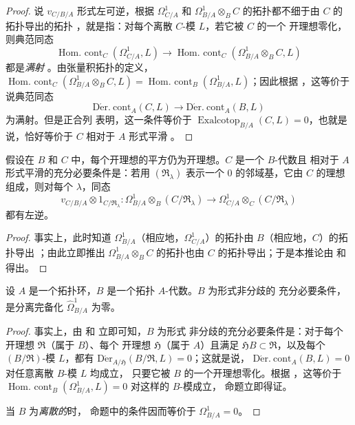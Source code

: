\begin{proof}
说 $v_{C/B/A}$ 形式左可逆，根据 $\Omega^1_{C/A}$ 和
$\Omega^1_{B/A}\otimes_B C$ 的拓扑都不细于由 $C$ 的拓扑导出的拓扑
，就是指：对每个离散 $C$-模 $L$，若它被 $C$ 的一个
开理想零化，则典范同态
\[
  \operatorname{Hom.\ cont}_C(\Omega^1_{C/A},L)\to
  \operatorname{Hom.\ cont}_C(\Omega^1_{B/A}\otimes_B C,L)
\]
都是\emph{满射} 。由张量积拓扑的定义，
$\operatorname{Hom.\ cont}_C(\Omega^1_{B/A}\otimes_B C,L)=
\operatorname{Hom.\ cont}_B(\Omega^1_{B/A},L)$；因此根据
，这等价于说典范同态
\[
  \operatorname{D\acute{e}r.\ cont}_A(C,L)\to
  \operatorname{D\acute{e}r.\ cont}_A(B,L)
\]
为满射。但是正合列  表明，这一条件等价于
$\operatorname{Exalcotop}_{B/A}(C,L)=0$，也就是说，恰好等价于 $C$ 相对于
$A$ 形式平滑 。
\end{proof}

\begin{corollary}[20.7.3]
\label{0.20.7.3-fr}
假设在 $B$ 和 $C$ 中，每个开理想的平方仍为开理想。$C$ 是一个 $B$-代数且
相对于 $A$ 形式平滑的充分必要条件是：若用 $(\mathfrak{R}_\lambda)$ 表示一个
$0$ 的邻域基，它由 $C$ 的理想组成，则对每个 $\lambda$，同态
\begin{equation}
\tag{20.7.3.1}
\label{0.20.7.3.1-fr}
  v_{C/B/A}\otimes 1_{C/\mathfrak{R}_\lambda}:
  \Omega^1_{B/A}\otimes_B(C/\mathfrak{R}_\lambda)\to
  \Omega^1_{C/A}\otimes_C(C/\mathfrak{R}_\lambda)
\end{equation}
都有左逆。
\end{corollary}

\begin{proof}
事实上，此时知道 $\Omega^1_{B/A}$（相应地，$\Omega^1_{C/A}$）的拓扑由
$B$（相应地，$C$）的拓扑导出 ；由此立即推出
$\Omega^1_{B/A}\otimes_B C$ 的拓扑也由 $C$ 的拓扑导出；于是本推论由
 和  得出。
\end{proof}

\begin{proposition}[20.7.4]
\label{0.20.7.4-fr}
设 $A$ 是一个拓扑环，$B$ 是一个拓扑 $A$-代数。$B$ 为形式非分歧的
 充分必要条件，是分离完备化
$\widehat{\Omega}^1_{B/A}$ 为零。
\end{proposition}

\begin{proof}
事实上，由  和  立即可知，$B$ 为形式
非分歧的充分必要条件是：对于每个开理想 $\mathfrak{R}$（属于 $B$）、每个
开理想 $\mathfrak{H}$（属于 $A$）且满足 $\mathfrak{H}B\subset\mathfrak{R}$，以及每个
$(B/\mathfrak{R})$-模 $L$，都有
$\operatorname{D\acute{e}r}_{A/\mathfrak{H}}(B/\mathfrak{R},L)=0$；这就是说，
$\operatorname{D\acute{e}r.\ cont}_A(B,L)=0$ 对任意离散 $B$-模 $L$ 均成立，
只要它被 $B$ 的一个开理想零化。根据 ，这等价于
$\operatorname{Hom.\ cont}_B(\Omega^1_{B/A},L)=0$ 对这样的 $B$-模成立，
命题立即得证。

当 $B$ 为\emph{离散的}时， 命题中的条件因而等价于
$\Omega^1_{B/A}=0$。
\end{proof}

